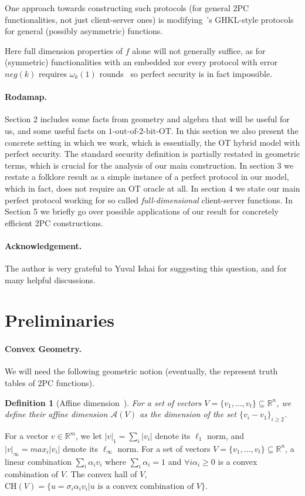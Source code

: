 \documentclass[a4paper]{article}
\newtheorem{definition}{Definition}[section]
\newcommand{\OT}[2]{#1\text{-out-of-}#2\text{-bit-OT}}
\newcommand{\R}{\mathbb{R}}
\newcommand{\affine}[1]{\mathcal{A}(#1)}
\newcommand{\CH}[1]{\text{CH}(#1)}
\begin{document}
One approach towards constructing such protocols (for general 2PC functionalities, not just client-server ones) is modifying~\cite{Ash14}'s GHKL-style protocols for general (possibly asymmetric) functions. 

Here full dimension properties of $f$ alone will not generally suffice, as for (symmetric) functionalities with an embedded xor every protocol with error $neg(k)$ requires $\omega_k(1)$ rounds~\cite{GHKL08} so perfect security is in fact impossible.

\paragraph{Rodamap.} Section 2 includes some facts from geometry
and algebra that will be useful for us, and some useful facts on $\OT{1}{2}$. In this section we also present the concrete setting in which we work, which is essentially, the OT hybrid model with perfect security. The standard security definition is partially restated in geometric terms, which is crucial for the analysis of our main construction.
In section 3 we restate a folklore result as a simple instance of a perfect protocol in our model, which in fact, does not require an OT oracle at all. In section 4 we state our main perfect protocol working for so called \emph{full-dimensional} client-server functions.
In Section 5 we briefly go over possible applications of our result for concretely efficient 2PC constructions.

\paragraph{Acknowledgement.}

The author is very grateful to Yuval Ishai for suggesting this question, and for many helpful discussions. 

\section{Preliminaries}

\paragraph{Convex Geometry.} We will need the following geometric notion (eventually, the represent truth tables of 2PC functions).
\begin{definition}[Affine dimension~\cite{Ash14}]
	For a set of vectors $V=\{v_1,\ldots,v_t\}\subseteq\R^n$, we define their affine dimension $\affine{V}$ as the dimension of the set
	$\{v_i-v_1\}_{i\geq 2}$. 
\end{definition}
For a vector $v\in \R^m$, 
we let $|v|_1=\sum_i|v_i|$ denote its $\ell_1$ norm, and $|v|_\infty=max_i |v_i|$ denote its $\ell_\infty$ norm.
For a set of vectors $V=\{v_1,\ldots,v_t\}\subseteq\R^n$, a linear combination $\sum_i \alpha_iv_i$ where $\sum_i\alpha_i=1$ and $\forall i\alpha_i\geq 0$ is a convex combination of $V$. The convex hall of $V$,
$\CH{V}=\{u=\sigma_i\alpha_iv_i|u\text{ is a convex combination of }V\}$.
\end{document}
